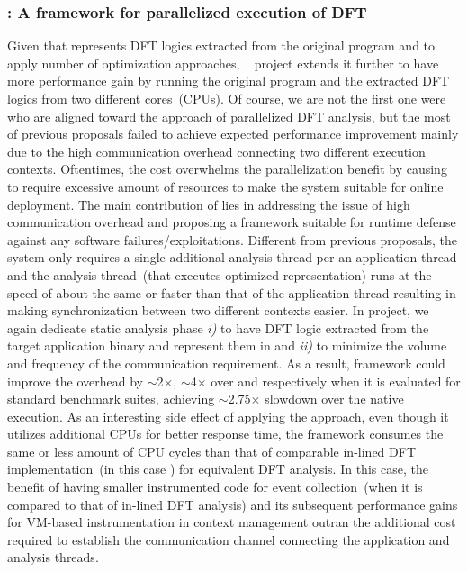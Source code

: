 \documentclass[letterpaper, 10pt]{article}
\begin{document}
\begin{small}
\subsubsection*{\SR: A framework for parallelized execution of DFT}
%
Given that \TFA represents DFT logics extracted from the original program and
to apply number of optimization approaches, \SR~\cite{sreplica:2013ccs} project
extends it further to have more performance gain by running the original
program and the extracted DFT logics from two different cores~(CPUs).
%
Of course, we are not the first one were who are aligned toward the approach of
parallelized DFT analysis, but the most of previous proposals failed to achieve
expected performance improvement mainly due to the high communication overhead
connecting two different execution contexts. Oftentimes, the cost overwhelms
the parallelization benefit by causing to require excessive amount of resources
to make the system suitable for online deployment.
%
The main contribution of \SR lies in addressing the issue of high communication
overhead and proposing a framework  suitable for runtime defense against any
software failures/exploitations. Different from previous proposals, the system
only requires a single additional analysis thread per an application thread and
the analysis thread~(that executes optimized \TFA representation) runs at the
speed of about the same or faster than that of the application thread resulting
in making synchronization between two different contexts easier.
%
In \SR project, we again dedicate static analysis phase {\it i)} to have DFT
logic extracted from the target application binary and represent them in \TFA
and {\it ii)} to minimize the volume and frequency of the communication
requirement.
%
%
As a result, \SR framework could improve the overhead by $\sim$2$\times$,
$\sim$4$\times$ over \TFA and \libdft respectively when it is evaluated for
standard benchmark suites, achieving $\sim$2.75$\times$ slowdown over the
native execution.
%
As an interesting side effect of applying the \SR approach, even though it
utilizes additional CPUs for better response time, the framework consumes the
same or less amount of CPU cycles than that of comparable in-lined DFT
implementation~(in this case \TFA) for equivalent DFT analysis.
%
In this case, the benefit of having smaller instrumented code for event
collection~(when it is compared to that of in-lined DFT analysis) and its
subsequent performance gains for VM-based instrumentation in context management
outran the additional cost required to establish the communication channel
connecting the application and analysis threads.


\end{small}
\end{document}
